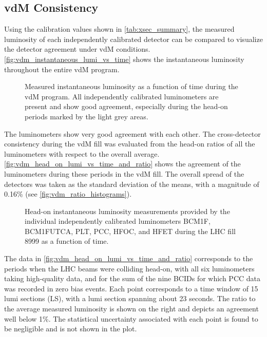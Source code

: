 \newpage

\subsection{vdM Consistency}
\label{subsec:vdm_consistency}

Using the calibration values shown in \autoref{tab:xsec_summary}, the measured luminosity of each independently calibrated detector can be compared to visualize the detector agreement under vdM conditions. \autoref{fig:vdm_instantaneous_lumi_vs_time} shows the instantaneous luminosity throughout the entire vdM program.

\begin{figure}[!htb]
	\centering
	\caption{Measured instantaneous luminosity as a function of time during the vdM program. All independently calibrated luminometers are present and show good agreement, especially during the head-on periods marked by the light grey areas.}
	\label{fig:vdm_instantaneous_lumi_vs_time}
\end{figure}

The luminometers show very good agreement with each other. The cross-detector consistency during the vdM fill was evaluated from the head-on ratios of all the luminometers with respect to the overall average. \autoref{fig:vdm_head_on_lumi_vs_time_and_ratio} shows the agreement of the luminometers during these periods in the vdM fill. The overall spread of the detectors was taken as the standard deviation of the means, with a magnitude of 0.16\% (see \autoref{fig:vdm_ratio_histograms}).

\begin{figure}[!htb]
	\centering
	\caption{Head-on instantaneous luminosity measurements provided by the individual independently calibrated luminometers BCM1F, BCM1FUTCA, PLT, PCC, HFOC, and HFET during the LHC fill 8999 as a function of time.}
	\label{fig:vdm_head_on_lumi_vs_time_and_ratio}
\end{figure}

The data in \autoref{fig:vdm_head_on_lumi_vs_time_and_ratio} corresponds to the periods when the LHC beams were colliding head-on, with all six luminometers taking high-quality data, and for the sum of the nine BCIDs for which PCC data was recorded in zero bias events. Each point corresponds to a time window of 15 lumi sections (LS), with a lumi section spanning about 23 seconds. The ratio to the average measured luminosity is shown on the right and depicts an agreement well below 1\%. The statistical uncertainty associated with each point is found to be negligible and is not shown in the plot.

